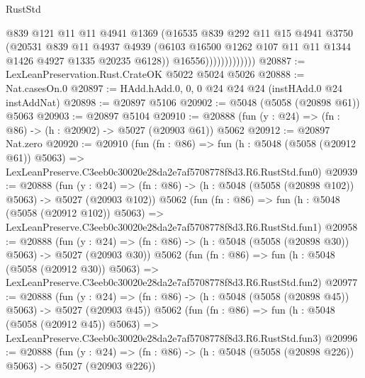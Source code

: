 \begin{lexlean}{RustStd}
\begin{coremodule}
                            @839
                            @121
                            @11
                            @11
                            @4941
                            @1369
                            (@16535
                              @839
                              @292
                              @11
                              @15
                              @4941
                              @3750
                              (@20531
                                @839
                                @11
                                @4937
                                @4939
                                (@6103
                                  @16500
                                  @1262
                                  @107
                                  @11
                                  @11
                                  @1344
                                  @1426
                                  @4927
                                  @1335
                                  @20235
                                  @6128))
                              @16556)))))))))))))
@20887 := LexLeanPreservation.Rust.CrateOK @5022 @5024 @5026
@20888 := Nat.casesOn.{0}
@20897 := HAdd.hAdd.{0, 0, 0} @24 @24 @24 (instHAdd.{0} @24 instAddNat)
@20898 := @20897 @5106
@20902 := @5048 (@5058 (@20898 @61)) @5063
@20903 := @20897 @5104
@20910 := @20888 (fun (y : @24) => (fn : @86) -> (h : @20902) -> @5027 (@20903 @61)) @5062
@20912 := @20897 Nat.zero
@20920 := @20910
    (fun (fn : @86) =>
    fun (h : @5048 (@5058 (@20912 @61)) @5063) =>
    LexLeanPreserve.C3eeb0c30020e28da2e7af5708778f8d3.R6.RustStd.fun0)
@20939 := @20888
    (fun (y : @24) => (fn : @86) -> (h : @5048 (@5058 (@20898 @102)) @5063) -> @5027 (@20903 @102))
    @5062
    (fun (fn : @86) =>
    fun (h : @5048 (@5058 (@20912 @102)) @5063) =>
    LexLeanPreserve.C3eeb0c30020e28da2e7af5708778f8d3.R6.RustStd.fun1)
@20958 := @20888
    (fun (y : @24) => (fn : @86) -> (h : @5048 (@5058 (@20898 @30)) @5063) -> @5027 (@20903 @30))
    @5062
    (fun (fn : @86) =>
    fun (h : @5048 (@5058 (@20912 @30)) @5063) =>
    LexLeanPreserve.C3eeb0c30020e28da2e7af5708778f8d3.R6.RustStd.fun2)
@20977 := @20888
    (fun (y : @24) => (fn : @86) -> (h : @5048 (@5058 (@20898 @45)) @5063) -> @5027 (@20903 @45))
    @5062
    (fun (fn : @86) =>
    fun (h : @5048 (@5058 (@20912 @45)) @5063) =>
    LexLeanPreserve.C3eeb0c30020e28da2e7af5708778f8d3.R6.RustStd.fun3)
@20996 := @20888
    (fun (y : @24) => (fn : @86) -> (h : @5048 (@5058 (@20898 @226)) @5063) -> @5027 (@20903 @226))

\end{coremodule}
\end{lexlean}

